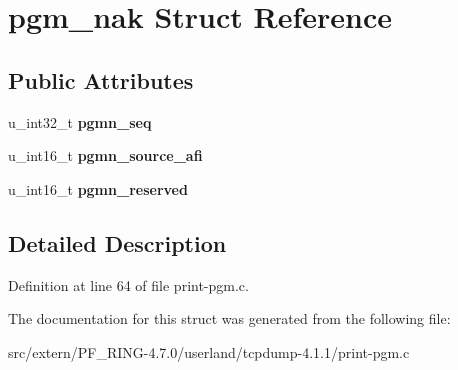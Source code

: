 \hypertarget{structpgm__nak}{
\section{pgm\_\-nak Struct Reference}
\label{structpgm__nak}
}
\subsection*{Public Attributes}
\begin{DoxyCompactItemize}
\item 
\hypertarget{structpgm__nak_a17536d853203a128d11382af44bf962b}{
u\_\-int32\_\-t {\bfseries pgmn\_\-seq}}
\label{structpgm__nak_a17536d853203a128d11382af44bf962b}

\item 
\hypertarget{structpgm__nak_a9dc447b3b9ec88a8b36d9123de5fd84f}{
u\_\-int16\_\-t {\bfseries pgmn\_\-source\_\-afi}}
\label{structpgm__nak_a9dc447b3b9ec88a8b36d9123de5fd84f}

\item 
\hypertarget{structpgm__nak_a0b87b90e76f090a987d4256f1411f38f}{
u\_\-int16\_\-t {\bfseries pgmn\_\-reserved}}
\label{structpgm__nak_a0b87b90e76f090a987d4256f1411f38f}

\end{DoxyCompactItemize}


\subsection{Detailed Description}


Definition at line 64 of file print-\/pgm.c.



The documentation for this struct was generated from the following file:\begin{DoxyCompactItemize}
\item 
src/extern/PF\_\-RING-\/4.7.0/userland/tcpdump-\/4.1.1/print-\/pgm.c\end{DoxyCompactItemize}
